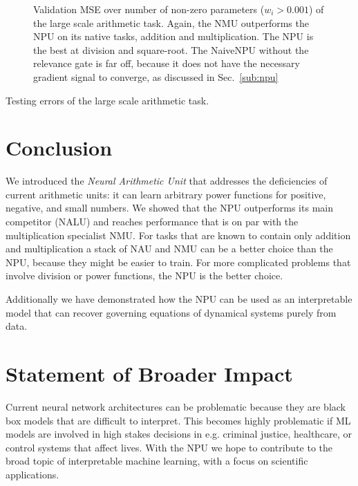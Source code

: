 \documentclass[9pt]{article}
\begin{document}
\begin{figure}
  \centering
  \resizebox{\textwidth}{!}{}
  \caption{Validation MSE over number of non-zero parameters ($w_i > 0.001$) of the large scale
  arithmetic task.  Again, the NMU outperforms the NPU on its
  native tasks, addition and multiplication. The NPU is the best at division
  and square-root.  The NaiveNPU without the relevance gate is far off, because
  it does not have the necessary gradient signal to converge, as discussed in
  Sec.~\ref{sub:npu}}%
  \label{fig:pareto}
\end{figure}

\begin{table}
  \centering
  \caption{Testing errors of the large scale arithmetic task.}
  \label{tab:arithmetic100_val}
  
\end{table}

 
\section{Conclusion}%
\label{sec:conclusion}

We introduced the \emph{Neural Arithmetic Unit} that addresses the deficiencies
of current arithmetic units: it can learn arbitrary power functions for
positive, negative, and small numbers. We showed that the NPU outperforms its
main competitor (NALU) and reaches performance that is on par with the
multiplication specialist NMU.  For tasks that are known to contain only
addition and multiplication a stack of NAU and NMU can be a better choice than
the NPU, because they might be easier to train. For more complicated problems
that involve division or power functions, the NPU is the better choice.

Additionally we have demonstrated how the NPU can be used as an interpretable
model that can recover governing equations of dynamical systems purely from
data.

\section{Statement of Broader Impact}%
\label{sec:statement_of_broader_impact}

Current neural network architectures can be problematic because they are black
box models that are difficult to interpret. This becomes highly problematic if
ML models are involved in high stakes decisions in e.g. criminal justice,
healthcare, or control systems that affect lives.  With the NPU we hope to
contribute to the broad topic of interpretable machine learning, with a focus
on scientific applications.
\end{document}
